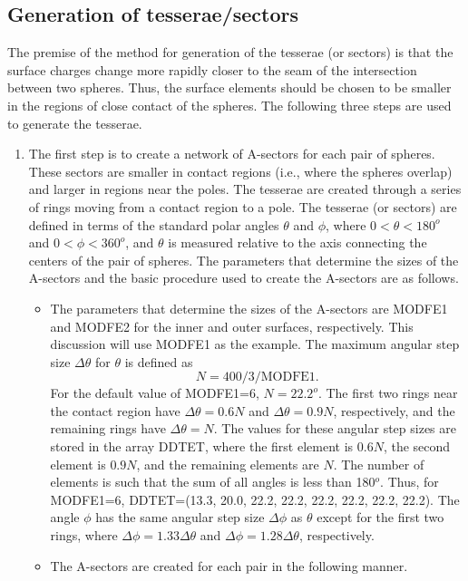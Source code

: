 \documentclass[oneside,11pt,openany]{book}
\begin{document}
\subsection*{Generation of tesserae/sectors}
%
The premise of the method for generation of the tesserae (or sectors)
is that the surface charges
change more rapidly closer to the seam of the intersection
between two spheres.  Thus, the surface elements should be
chosen to be smaller in the regions of close contact of the spheres.
The following three steps are used to generate the tesserae.
\begin{enumerate}
\item{The first step
is to create a network of A-sectors for each pair of spheres.  
These sectors
are smaller in contact regions (i.e., where the spheres overlap) and larger
in regions near the poles.
The tesserae are created through a series
of rings moving from a contact region to a pole.
The tesserae (or sectors) are defined in terms of
the standard polar angles $\theta$ and $\phi$, where
$0<\theta<180^o$ and $0<\phi<360^o$, and $\theta$
is measured relative to the axis connecting the centers of the pair
of spheres.  The parameters that determine the sizes of the A-sectors
and the basic procedure used to create the A-sectors
are as follows.
\begin{itemize}
\item{The parameters that determine the sizes of the A-sectors
are MODFE1 and MODFE2 for the inner and outer surfaces,
respectively.  
This discussion will use MODFE1 as the example.
The maximum angular step size $\Delta \theta$ for $\theta$ is defined
as 
\begin{equation}
N=400/3/\mbox{MODFE1}.
\end{equation}
For the default value of MODFE1=6, $N=22.2^o$.
The first two rings near the contact region have
$\Delta \theta=0.6N$ and $\Delta \theta =0.9N$, respectively, and the remaining
rings have $\Delta \theta= N$.
The values for these angular step sizes are stored in the
array DDTET, where the first element is $0.6N$,
the second element is $0.9N$, and the remaining elements are $N$.
The number of elements is such that the sum of all angles
is less than 180$^o$.  Thus, for MODFE1=6,
DDTET=(13.3, 20.0, 22.2, 22.2, 22.2, 22.2, 22.2, 22.2).
The angle $\phi$ has the same angular step size $\Delta \phi$ as $\theta$
except for the first two rings, where $\Delta \phi=1.33 \Delta \theta$
and $\Delta \phi=1.28 \Delta \theta$, respectively.}
\item{
The A-sectors are created for each pair in the following manner.
}
\end{itemize}}
\end{enumerate}
\end{document}

